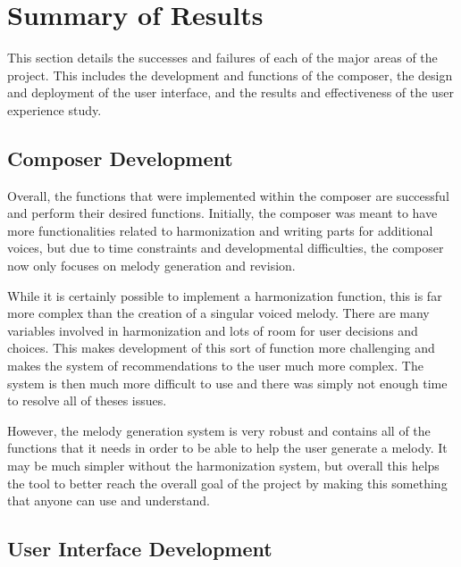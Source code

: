 \section{Summary of Results}
\label{sec:summaryofresults}

This section details the successes and failures of each of the major areas of the project.  This includes the development and functions of the composer, the design and deployment of the user interface, and the results and effectiveness of the user experience study.

\subsection{Composer Development}
\label{subsec:summaryofresultscomposerdevelopment}

Overall, the functions that were implemented within the composer are successful and perform their desired functions.  Initially, the composer was meant to have more functionalities related to harmonization and writing parts for additional voices, but due to time constraints and developmental difficulties, the composer now only focuses on melody generation and revision.

\vspace{\baselineskip}

While it is certainly possible to implement a harmonization function, this is far more complex than the creation of a singular voiced melody.  There are many variables involved in harmonization and lots of room for user decisions and choices.  This makes development of this sort of function more challenging and makes the system of recommendations to the user much more complex.  The system is then much more difficult to use and there was simply not enough time to resolve all of theses issues.

\vspace{\baselineskip}

However, the melody generation system is very robust and contains all of the functions that it needs in order to be able to help the user generate a melody.  It may be much simpler without the harmonization system, but overall this helps the tool to better reach the overall goal of the project by making this something that anyone can use and understand.

\subsection{User Interface Development}
\label{subsec:summaryofresultsuserinterfacedevelopment}




